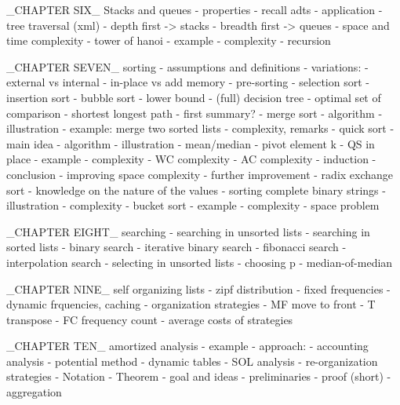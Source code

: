 \documentclass[openright,twoside,headsepline,bibtotoc]{scrbook}[2007/12/24]
\begin{document}
        	_CHAPTER SIX_ Stacks and queues
        	- properties
        	- recall adts
        	- application
        		- tree traversal (xml)
        		- depth first -> stacks
        		- breadth first -> queues
        		- space and time complexity
        	- tower of hanoi
        		- example
        		- complexity
        		- recursion
        		
        	_CHAPTER SEVEN_ sorting
        	- assumptions and definitions
        	- variations:
        		- external vs internal
        		- in-place vs add memory
        		- pre-sorting
        	- selection sort
        	- insertion sort
        	- bubble sort
        	- lower bound
        	- (full) decision tree
        		- optimal set of comparison
        		- shortest longest path
        	- first summary?
      	- merge sort
      		- algorithm
      		- illustration
      		- example: merge two sorted lists
      		- complexity, remarks
      	- quick sort
      		- main idea
      		- algorithm
      		- illustration
      		- mean/median
      		- pivot element k
      		- QS in place
      		- example
      		- complexity
      			- WC complexity
      			- AC complexity
      			- induction
      			- conclusion
      		- improving space complexity
      		- further improvement
      	- radix exchange sort 
      		- knowledge on the nature of the values
      		- sorting complete binary strings
      		- illustration
      		- complexity
      	- bucket sort
      		- example
      		- complexity
      		- space problem
      	
      	_CHAPTER EIGHT_ searching
      	- searching in unsorted lists
      	- searching in sorted lists
      		- binary search
      		- iterative binary search
      		- fibonacci search
      		- interpolation search
      	- selecting in unsorted lists
      		- choosing p
      		- median-of-median
      		
      	_CHAPTER NINE_ self organizing lists
      	- zipf distribution
      	- fixed frequencies
      	- dynamic frquencies, caching
      	- organization strategies
      		- MF move to front
      		- T transpose
      		- FC frequency count
      	- average costs of strategies
      	
      	_CHAPTER TEN_ amortized analysis
      	- example
      	- approach:
      		- accounting analysis
      		- potential method
      	- dynamic tables
      	- SOL analysis
      		- re-organization strategies
      		- Notation
      		- Theorem
      		- goal and ideas
      		- preliminaries
      		- proof (short)
      	- aggregation
      	
\end{document}
